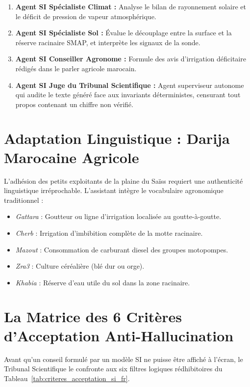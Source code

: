 \documentclass[11pt,a4paper,oneside]{report}
\begin{document}
\begin{enumerate}[leftmargin=*]
    \item \textbf{Agent SI Spécialiste Climat :} Analyse le bilan de rayonnement solaire et le déficit de pression de vapeur atmosphérique.
    \item \textbf{Agent SI Spécialiste Sol :} Évalue le découplage entre la surface et la réserve racinaire SMAP, et interprète les signaux de la sonde.
    \item \textbf{Agent SI Conseiller Agronome :} Formule des avis d'irrigation déficitaire rédigés dans le parler agricole marocain.
    \item \textbf{Agent SI Juge du Tribunal Scientifique :} Agent superviseur autonome qui audite le texte généré face aux invariants déterministes, censurant tout propos contenant un chiffre non vérifié.
\end{enumerate}

\section{Adaptation Linguistique : Darija Marocaine Agricole}
L'adhésion des petits exploitants de la plaine du Saïss requiert une authenticité linguistique irréprochable. L'assistant intègre le vocabulaire agronomique traditionnel :
\begin{itemize}[leftmargin=*]
    \item \textit{Gattara} : Goutteur ou ligne d'irrigation localisée au goutte-à-goutte.
    \item \textit{Cherb} : Irrigation d'imbibition complète de la motte racinaire.
    \item \textit{Mazout} : Consommation de carburant diesel des groupes motopompes.
    \item \textit{Zra3} : Culture céréalière (blé dur ou orge).
    \item \textit{Khabia} : Réserve d'eau utile du sol dans la zone racinaire.
\end{itemize}

\section{La Matrice des 6 Critères d'Acceptation Anti-Hallucination}
Avant qu'un conseil formulé par un modèle SI ne puisse être affiché à l'écran, le Tribunal Scientifique le confronte aux six filtres logiques rédhibitoires du Tableau~\ref{tab:criteres_acceptation_si_fr}.
\end{document}
